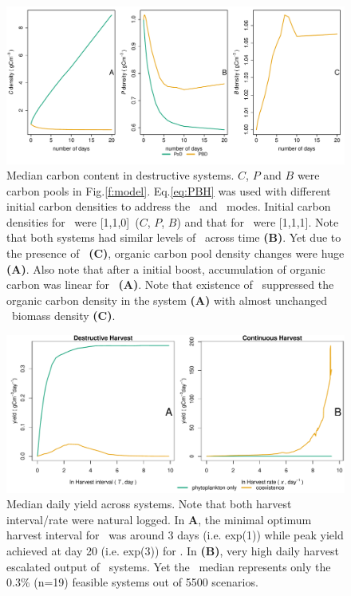 \documentclass[../thesis.tex]{subfiles} %
\begin{document}
\begin{figure}[H]
    \centering
    \includegraphics[width=\linewidth]{result/Sample.pdf}
    \caption[Median carbon content in destructive systems]{Median carbon content in destructive systems.  $C$, $P$ and $B$ were carbon pools in Fig.\ref{f:model}.  Eq.\ref{eq:PBH} was used with different initial carbon densities to address the \PoN\ and \PBN\ modes.  Initial carbon densities for \PoN\ were [1,1,0]\den\ ($C$, $P$, $B$) and that for \PBN\ were [1,1,1]\den.  Note that both systems had similar levels of \phy\ across time \textbf{(B)}.  Yet due to the presence of \bac\ \textbf{(C)}, organic carbon pool density changes were huge \textbf{(A)}.  Also note that after a initial boost, accumulation of organic carbon was linear for \PoN\ \textbf{(A)}.  Note that existence of \bac\ suppressed the organic carbon density in the system \textbf{(A)} with almost unchanged \bac\ biomass density \textbf{(C)}.}
    \label{f:destCarbon}
\end{figure}

\begin{figure}[H]
    \centering
    \includegraphics[width=\linewidth]{result/DailyYield.pdf}
    \caption[Median daily yield across systems]{Median daily yield across systems.  Note that both harvest interval/rate were natural logged.  In \textbf{A}, the minimal optimum harvest interval for \PoN\ was around 3 days (i.e. exp(1)) while peak yield achieved at day 20 (i.e. exp(3)) for \PBN.  In \textbf{(B)}, very high daily harvest escalated output of \PBH\ systems.  Yet the \PBH\ median represents only the 0.3\% (n=19) feasible systems out of 5500 scenarios.}
    \label{f:ydDaily}
\end{figure}
\end{document}
